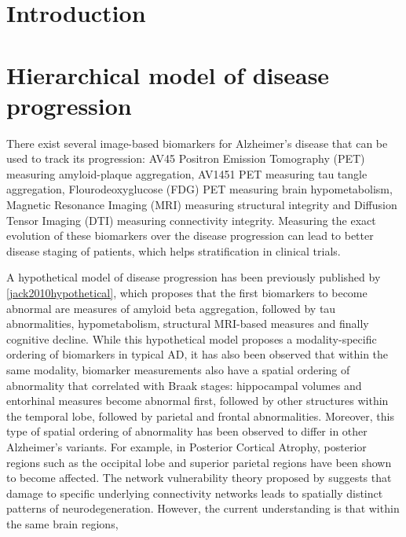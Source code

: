 \documentclass{llncs}
\begin{document}

\section{Introduction}



\section{Hierarchical model of disease progression}

There exist several image-based biomarkers for Alzheimer's disease that can be used to track its progression: AV45 Positron Emission Tomography (PET) measuring amyloid-plaque aggregation, AV1451 PET measuring tau tangle aggregation, Flourodeoxyglucose (FDG) PET measuring brain hypometabolism, Magnetic Resonance Imaging (MRI) measuring structural integrity and Diffusion Tensor Imaging (DTI) measuring connectivity integrity. Measuring the exact evolution of these biomarkers over the disease progression can lead to better disease staging of patients, which helps stratification in clinical trials.

A hypothetical model of disease progression has been previously published by \ref{jack2010hypothetical}, which proposes that the first biomarkers to become abnormal are measures of amyloid beta aggregation, followed by tau abnormalities, hypometabolism, structural MRI-based measures and finally cognitive decline. While this hypothetical model proposes a modality-specific ordering of biomarkers in typical AD, it has also been observed that within the same modality, biomarker measurements also have a spatial ordering of abnormality that correlated with Braak stages: hippocampal volumes and entorhinal measures become abnormal first, followed by other structures within the temporal lobe, followed by parietal and frontal abnormalities. Moreover, this type of spatial ordering of abnormality has been observed to differ in other Alzheimer's variants. For example, in Posterior Cortical Atrophy, posterior regions such as the occipital lobe and superior parietal regions have been shown to become affected. The network vulnerability theory proposed by \cite{seeley2009neurodegenerative} suggests that damage to specific underlying connectivity networks leads to spatially distinct patterns of neurodegeneration. However, the current understanding is that within the same brain regions, 
\end{document}
